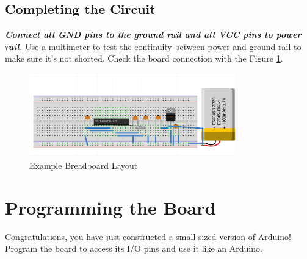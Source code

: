 \documentclass{article}
\begin{document}
\subsection{Completing the Circuit}
\textbf{\emph{Connect all GND pins to the ground rail and all VCC pins to power rail.}} Use a multimeter to test the continuity between power and ground rail to make sure it's not shorted. Check the board connection with the Figure \ref{img:egBBL}.

\begin{figure}[!h]
    \center
    \includegraphics[width=0.8\textwidth,keepaspectratio]{egBBL}
    \caption{Example Breadboard Layout}
    \label{img:egBBL}
\end{figure}

\section{Programming the Board}
Congratulations, you have just constructed a small-sized version of Arduino! Program the board to access its I/O pins and use it like an Arduino.
\end{document}
